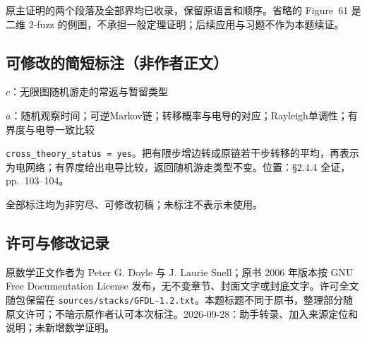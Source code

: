 \documentclass[UTF8,11pt]{ctexart}
\theoremstyle{definition}
\begin{document}
原主证明的两个段落及全部界均已收录，保留原语言和顺序。省略的 Figure~61 是二维 $2$-fuzz 的例图，不承担一般定理证明；后续应用与习题不作为本题续证。
\subsection*{可修改的简短标注（非作者正文）}
$c$：无限图随机游走的常返与暂留类型

$a$：随机观察时间；可逆Markov链；转移概率与电导的对应；Rayleigh单调性；有界度与电导一致比较

\texttt{cross\_theory\_status = yes}。把有限步增边转成原链若干步转移的平均，再表示为电网络；有界度给出电导比较，返回随机游走类型不变。位置：\S2.4.4 全证，pp.~103--104。

全部标注均为非穷尽、可修改初稿；未标注不表示未使用。
\subsection*{许可与修改记录}
原数学正文作者为 Peter G. Doyle 与 J. Laurie Snell；原书 2006 年版本按 GNU Free Documentation License 发布，无不变章节、封面文字或封底文字。许可全文随包保留在 \texttt{sources/stacks/GFDL-1.2.txt}。本题标题不同于原书，整理部分随原文许可；不暗示原作者认可本次标注。2026-09-28：助手转录、加入来源定位和说明；未新增数学证明。
\end{document}

